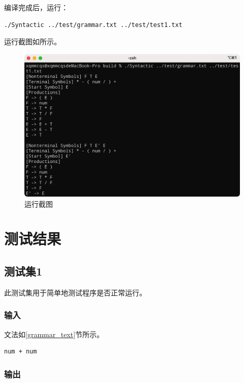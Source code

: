 \documentclass[lang=cn,11pt,a4paper,cite=authornum]{paper}
\begin{document}
编译完成后，运行：

\begin{code}
    \begin{verbatim}
./Syntactic ../test/grammar.txt ../test/test1.txt
\end{verbatim}
\end{code}

运行截图如所示。

\begin{figure}[htbp]

    \centering
    \includegraphics[width=0.7\linewidth]{./Images/running.png}
    \caption{运行截图\label{fig:running}}

\end{figure}

\section{测试结果}

\subsection{测试集1}

此测试集用于简单地测试程序是否正常运行。

\subsubsection{输入}

文法如\ref{grammar_text}节所示。

\begin{code}
    \begin{verbatim}
num + num
\end{verbatim}
\end{code}

\subsubsection{输出}
\end{document}
